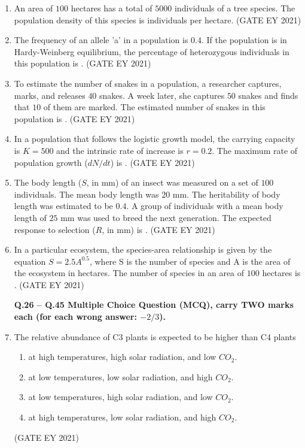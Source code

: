 \documentclass[journal]{IEEEtran}
\begin{document}
\begin{enumerate}
    \item An area of $100$ hectares has a total of $5000$ individuals of a tree species. The population density of this species is \underline{\hspace{3cm}} individuals per hectare.
    \hfill{(GATE EY 2021)}

    \item The frequency of an allele 'a' in a population is $0.4$. If the population is in Hardy-Weinberg equilibrium, the percentage of heterozygous individuals in this population is \underline{\hspace{3cm}}.
    \hfill{(GATE EY 2021)}

    \item To estimate the number of snakes in a population, a researcher captures, marks, and releases $40$ snakes. A week later, she captures $50$ snakes and finds that $10$ of them are marked. The estimated number of snakes in this population is \underline{\hspace{3cm}}.
    \hfill{(GATE EY 2021)}

    \item In a population that follows the logistic growth model, the carrying capacity is $K=500$ and the intrinsic rate of increase is $r=0.2$. The maximum rate of population growth ($dN/dt$) is \underline{\hspace{3cm}}.
    \hfill{(GATE EY 2021)}

    \item The body length ($S$, in mm) of an insect was measured on a set of $100$ individuals. The mean body length was $20$ mm. The heritability of body length was estimated to be $0.4$. A group of individuals with a mean body length of $25$ mm was used to breed the next generation. The expected response to selection ($R$, in mm) is \underline{\hspace{3cm}}.
    \hfill{(GATE EY 2021)}

    \item In a particular ecosystem, the species-area relationship is given by the equation $S = 2.5 A^{0.5}$, where S is the number of species and A is the area of the ecosystem in hectares. The number of species in an area of $100$ hectares is \underline{\hspace{3cm}}.
    \hfill{(GATE EY 2021)}

\textbf{Q.26 -- Q.45 Multiple Choice Question (MCQ), carry TWO marks each (for each wrong answer: $-2/3$).}

    \item The relative abundance of C3 plants is expected to be higher than C4 plants
    \begin{enumerate}
        \item at high temperatures, high solar radiation, and low $CO_2$.
        \item at low temperatures, low solar radiation, and high $CO_2$.
        \item at low temperatures, high solar radiation, and low $CO_2$.
        \item at high temperatures, low solar radiation, and high $CO_2$.
    \end{enumerate}
    \hfill{(GATE EY 2021)}


\end{enumerate}
\end{document}
